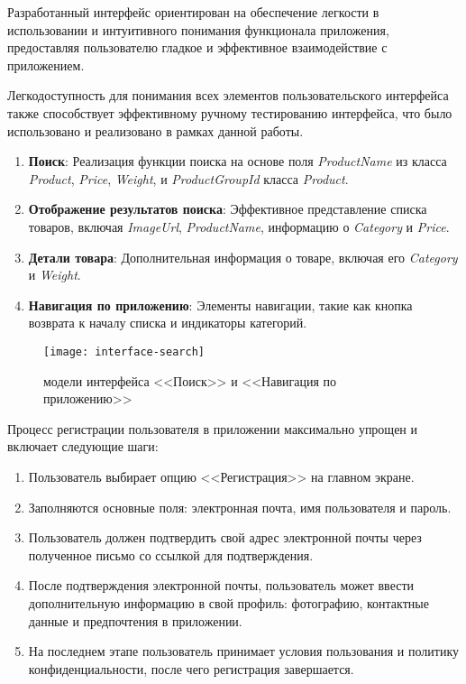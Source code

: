 Разработанный интерфейс ориентирован на обеспечение легкости в использовании и интуитивного понимания функционала приложения, предоставляя пользователю гладкое и эффективное взаимодействие с приложением.

Легкодоступность для понимания всех элементов пользовательского интерфейса также способствует эффективному ручному тестированию интерфейса, что было использовано и реализовано в рамках данной работы.

\begin{enumerate}
    \item \textbf{Поиск}: Реализация функции поиска на основе поля \textit{ProductName} из класса \textit{Product}, \textit{Price}, \textit{Weight}, и \textit{ProductGroupId} класса \textit{Product}.
    \item \textbf{Отображение результатов поиска}: Эффективное представление списка товаров, включая \textit{ImageUrl}, \textit{ProductName}, информацию о \textit{Category} и \textit{Price}.
    \item \textbf{Детали товара}: Дополнительная информация о товаре, включая его \textit{Category} и \textit{Weight}.
    \item \textbf{Навигация по приложению}: Элементы навигации, такие как кнопка возврата к началу списка и индикаторы категорий.
\end{enumerate}

\begin{figure}[h!]
    \texttt{[image: interface-search]}
    \caption{модели интерфейса <<Поиск>> и <<Навигация по приложению>>}
    \label{fig:search}
\end{figure}

Процесс регистрации пользователя в приложении максимально упрощен и включает следующие шаги:
\begin{enumerate}
    \item Пользователь выбирает опцию <<Регистрация>> на главном экране.
    \item Заполняются основные поля: электронная почта, имя пользователя и пароль.
    \item Пользователь должен подтвердить свой адрес электронной почты через полученное письмо со ссылкой для подтверждения.
    \item После подтверждения электронной почты, пользователь может ввести дополнительную информацию в свой профиль: фотографию, контактные данные и предпочтения в приложении.
    \item На последнем этапе пользователь принимает условия пользования и политику конфиденциальности, после чего регистрация завершается.
\end{enumerate}

